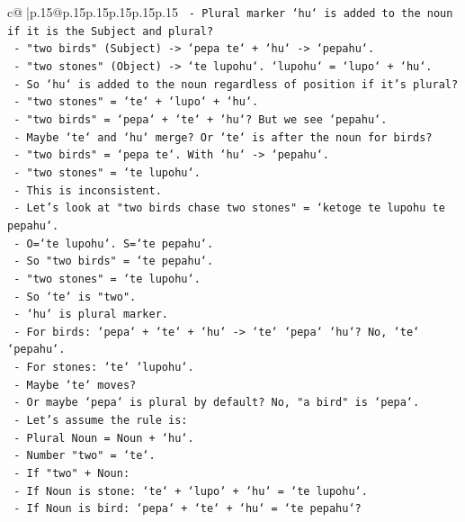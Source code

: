 \documentclass{article}
\begin{document}
{\begin{supertabular}{c@{$\;$}|p{.15\linewidth}@{}p{.15\linewidth}p{.15\linewidth}p{.15\linewidth}p{.15\linewidth}p{.15\linewidth}}
{{{\texttt{  {-} Plural marker `hu` is added to the noun if it is the Subject and plural?} \\
\texttt{  {-} "two birds" (Subject) {-}> `pepa te` + `hu` {-}> `pepahu`.} \\
\texttt{  {-} "two stones" (Object) {-}> `te lupohu`. `lupohu` = `lupo` + `hu`.} \\
\texttt{  {-} So `hu` is added to the noun regardless of position if it's plural?} \\
\texttt{  {-} "two stones" = `te` + `lupo` + `hu`.} \\
\texttt{  {-} "two birds" = `pepa` + `te` + `hu`? But we see `pepahu`.} \\
\texttt{  {-} Maybe `te` and `hu` merge? Or `te` is after the noun for birds?} \\
\texttt{  {-} "two birds" = `pepa te`. With `hu` {-}> `pepahu`.} \\
\texttt{  {-} "two stones" = `te lupohu`.} \\
\texttt{  {-} This is inconsistent.} \\
\texttt{  {-} Let's look at "two birds chase two stones" = `ketoge te lupohu te pepahu`.} \\
\texttt{  {-} O=`te lupohu`. S=`te pepahu`.} \\
\texttt{  {-} So "two birds" = `te pepahu`.} \\
\texttt{  {-} "two stones" = `te lupohu`.} \\
\texttt{  {-} So `te` is "two".} \\
\texttt{  {-} `hu` is plural marker.} \\
\texttt{  {-} For birds: `pepa` + `te` + `hu` {-}> `te` `pepa` `hu`? No, `te` `pepahu`.} \\
\texttt{  {-} For stones: `te` `lupohu`.} \\
\texttt{  {-} Maybe `te` moves?} \\
\texttt{  {-} Or maybe `pepa` is plural by default? No, "a bird" is `pepa`.} \\
\texttt{  {-} Let's assume the rule is:} \\
\texttt{    {-} Plural Noun = Noun + `hu`.} \\
\texttt{    {-} Number "two" = `te`.} \\
\texttt{    {-} If "two" + Noun:} \\
\texttt{      {-} If Noun is stone: `te` + `lupo` + `hu` = `te lupohu`.} \\
\texttt{      {-} If Noun is bird: `pepa` + `te` + `hu` = `te pepahu`?} \\
}}}
\end{supertabular}}
\end{document}
